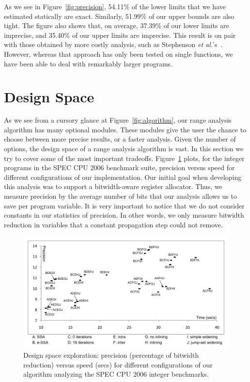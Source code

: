 \documentclass[preprint]{elsarticle}
\begin{document}
As we see in Figure~\ref{fig:precision}, 54.11\% of the lower limits that
we have estimated statically are exact.
Similarly, 51.99\% of our upper bounds are also tight.
The figure also shows that, on average, 37.39\% of our lower limits are
imprecise, and 35.40\% of our upper limits are imprecise.
This result is on pair with those obtained by more costly analysis, such as
Stephenson {\em et al.}'s~\cite{Stephenson00}.
However, whereas that approach has only been tested on single functions,
we have been able to deal with remarkably larger programs.

\section{Design Space}
\label{sec:design}

As we see from a cursory glance at Figure~\ref{fig:algorithm}, our range
analysis algorithm has many optional modules.
These modules give the user the chance to choose between more precise results,
or a faster analysis.
Given the number of options, the design space of a range analysis algorithm
is vast.
In this section we try to cover some of the most important tradeoffs.
Figure~\ref{fig:space} plots, for the integer programs in the SPEC CPU 2006
benchmark suite, precision versus speed for different configurations of
our implementation.
Our initial goal when developing this analysis was to support a bitwidth-aware
register allocator.
Thus, we measure precision by the average number of bits that our
analysis allows us to save per program variable.
It is very important to notice that we do not consider constants in our statistics of precision.
In other words, we only measure bitwidth reduction in variables that a constant
propagation step could not remove.


\begin{figure}[t!]
\begin{center}
\includegraphics[width=\textwidth]{images/space}
\end{center}
\caption{\label{fig:space}
Design space exploration: precision (percentage of bitwidth reduction)
versus speed (secs) for different configurations of our algorithm analyzing
the SPEC CPU 2006 integer benchmarks.}
\end{figure}
\end{document}
